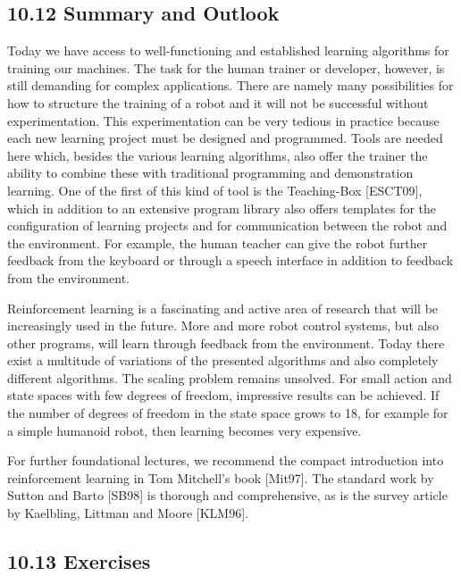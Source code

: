 \documentclass[10pt]{book}
\begin{document}
\begin{center}
\begin{enumerate}
\begin{center}
\begin{center}
\begin{center}
\begin{center}
\begin{center}
\subsection*{10.12 Summary and Outlook}
Today we have access to well-functioning and established learning algorithms for training our machines. The task for the human trainer or developer, however, is still demanding for complex applications. There are namely many possibilities for how to structure the training of a robot and it will not be successful without experimentation. This experimentation can be very tedious in practice because each new learning project must be designed and programmed. Tools are needed here which, besides the various learning algorithms, also offer the trainer the ability to combine these with traditional programming and demonstration learning. One of the first of this kind of tool is the Teaching-Box [ESCT09], which in addition to an extensive program library also offers templates for the configuration of learning projects and for communication between the robot and the environment. For example, the human teacher can give the robot further feedback from the keyboard or through a speech interface in addition to feedback from the environment.


Reinforcement learning is a fascinating and active area of research that will be increasingly used in the future. More and more robot control systems, but also other programs, will learn through feedback from the environment. Today there exist a multitude of variations of the presented algorithms and also completely different algorithms. The scaling problem remains unsolved. For small action and state spaces with few degrees of freedom, impressive results can be achieved. If the number of degrees of freedom in the state space grows to 18, for example for a simple humanoid robot, then learning becomes very expensive.

For further foundational lectures, we recommend the compact introduction into reinforcement learning in Tom Mitchell's book [Mit97]. The standard work by Sutton and Barto [SB98] is thorough and comprehensive, as is the survey article by Kaelbling, Littman and Moore [KLM96].

\subsection*{10.13 Exercises}

\end{center}
\end{center}
\end{center}
\end{center}
\end{center}
\end{enumerate}
\end{center}
\end{document}
